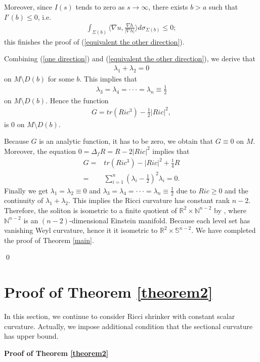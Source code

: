 \documentclass[12pt]{amsart}
\newcommand{\ban}{\begin{eqnarray*}}
\newcommand{\ean}{\end{eqnarray*}}
\begin{document}
	\smallskip
	Moreover, since $I(s)$ tends to zero as $s\rightarrow\infty$, there exists $b>a$ such that $I'(b)\leq 0$, i.e.
	\ban
	\int_{\Sigma(b)} \langle \nabla u, \frac{\nabla h}{|\nabla h|}\rangle d\sigma_{\Sigma(b)}\leq 0;
	\ean
	this finishes the proof of (\ref{equivalent the other direction}).


Combining (\ref{one direction}) and (\ref{equivalent the other direction}), we derive that
\ban
\lambda_1+\lambda_2=0
\ean
on $M\setminus D(b)$ for some $b$. This implies that
\ban
\lambda_3=\lambda_4=\cdot\cdot\cdot=\lambda_n\equiv \frac{1}{2}
\ean
on $M\setminus D(b)$.
Hence the function
\ban
G=tr(Ric^3)-\frac{1}{2}|Ric|^2,
\ean
is $0$ on $M\setminus D(b)$.

\smallskip
Because $G$ is an analytic function, it has to be zero, we obtain that $G\equiv 0$ on $M$. Moreover, the equation $0=\Delta_f R=R-2|Ric|^2$ implies that
\ban
G=&tr(Ric^3)-|Ric|^2+\frac{1}{4}R\\
=&\sum_{i=1}^n(\lambda_i-\frac{1}{2})^2 \lambda_i=0.
\ean
Finally we get $\lambda_1=\lambda_2\equiv 0$ and $\lambda_3=\lambda_4=\cdot\cdot\cdot=\lambda_n\equiv \frac{1}{2}$ due to $Ric\geq 0$ and the continuity of $\lambda_1+\lambda_2$. This implies the Ricci curvature has constant rank $n-2$. Therefore, the soliton   is  isometric to a finite quotient of $\mathbb{R}^2 \times \mathbb{N}^{n-2}$ by \cite{FR16}, where $\mathbb{N}^{n-2}$ is an $(n-2)$-dimensional Einstein manifold. Because each level set has vanishing  Weyl curvature, hence it it isometric to $\mathbb{R}^2\times \mathbb{S}^{n-2}$.
We have completed the proof of Theorem \ref{main}.

\qed

\section{Proof of Theorem \ref{theorem2}}
In this section, we continue to consider Ricci shrinker with constant scalar curvature. Actually, we impose additional condition that the sectional curvature has upper bound.


\noindent\textbf{Proof of Theorem \ref{theorem2}}
\end{document}
